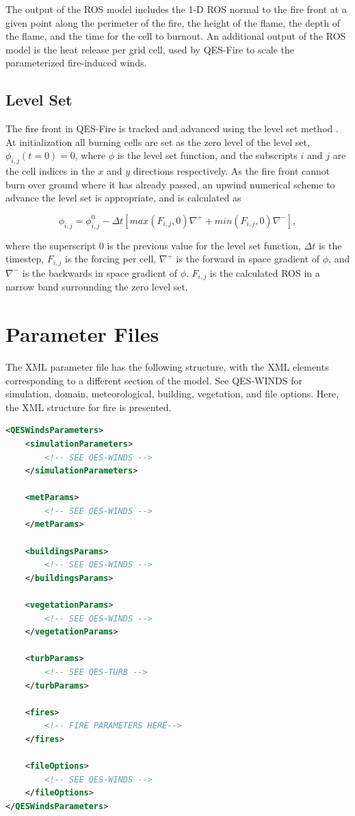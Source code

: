 The output of the ROS model includes the 1-D ROS normal to the fire front at a given point along the perimeter of the fire, the height of the flame, the depth of the flame, and the time for the cell to burnout. An additional output of the ROS model is the heat release per grid cell, used by QES-Fire to scale the parameterized fire-induced winds. 

\subsection{Level Set}

The fire front in QES-Fire is tracked and advanced using the level set method \cite{sethian1999}. At initialization all burning cells are set as the zero level of the level set, $\phi_{i,j}(t=0) = 0$, where $\phi$ is the level set function, and the subscripts $i$ and $j$ are the cell indices in the $x$ and $y$ directions respectively. As the fire front cannot burn over ground where it has already passed, an upwind numerical scheme to advance the level set is appropriate, and is calculated as 

\begin{equation}\label{eq:levelSet}
    \phi_{i,j} = \phi_{i,j}^{0} - \Delta t\left[max(F_{i,j},0)\nabla^{+} + min(F_{i,j},0)\nabla^{-}\right],
\end{equation}

where the superscript $0$ is the previous value for the level set function, $\Delta t$ is the timestep, $F_{i,j}$ is the forcing per cell, $\nabla^{+}$ is the forward in space gradient of $\phi$, and $\nabla^{-}$ is the backwards in space gradient of $\phi$. $F_{i,j}$ is the calculated ROS in a narrow band surrounding the zero level set.

\section{Parameter Files}

The XML parameter file has the following structure, with the XML elements corresponding to a different section of the model. See QES-WINDS for simulation, domain, meteorological, building, vegetation, and file options. Here, the XML structure for fire is presented.

\begin{lstlisting}[language=XML]
<QESWindsParameters>
    <simulationParameters>
        <!-- SEE QES-WINDS -->
    </simulationParameters>

    <metParams>
        <!-- SEE QES-WINDS -->
    </metParams>

    <buildingsParams>
        <!-- SEE QES-WINDS -->
    </buildingsParams>

    <vegetationParams>
        <!-- SEE QES-WINDS -->
    </vegetationParams>

    <turbParams>
        <!-- SEE QES-TURB -->
    </turbParams>

    <fires>
        <!-- FIRE PARAMETERS HERE-->
    </fires>

    <fileOptions>
        <!-- SEE QES-WINDS -->
    </fileOptions>
</QESWindsParameters>
\end{lstlisting}


